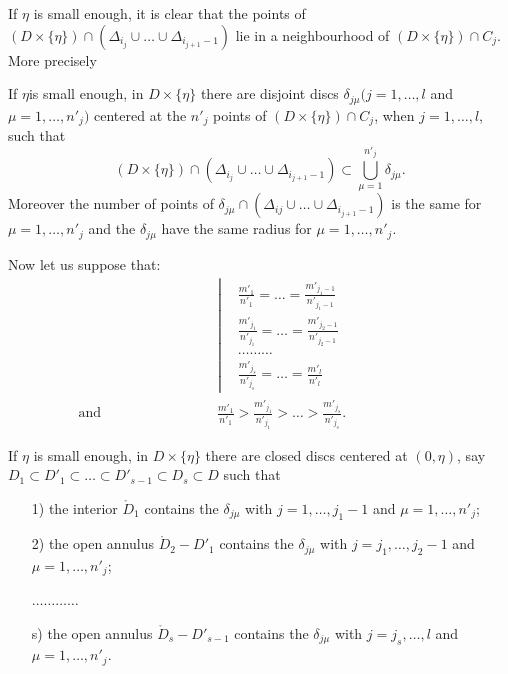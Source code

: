 If $\eta$ is small enough, it is clear that the points of $(D \times \{\eta\}) \cap (\Delta_{i_j} \cup \ldots \cup \Delta_{i_{j+1}-1})$ lie in a neighbourhood of $(D\times \{\eta\}) \cap C_j$. More precisely

\setcounter{lemma}{3}
\begin{lemma}\label{art15-lem2.4}
If $\eta$\pageoriginale is small enough, in $D \times \{\eta\}$ there are disjoint discs $\delta_{j\mu} (j = 1, \ldots, l$ and $\mu = 1, \ldots, n'_j)$ centered at the $n'_j$ points of $(D \times \{\eta\}) \cap C_j$, when $j = 1, \ldots, l$, such that 
$$
(D \times \{ \eta\}) \cap (\Delta_{i_j} \cup \ldots \cup \Delta_{i_{j+1} -1}) \subset \bigcup\limits^{n'_j}_{\mu = 1} \delta_{j\mu}.
$$
Moreover the number of points of $\delta_{j\mu} \cap (\Delta_{ij} \cup \ldots \cup \Delta_{i_{j+1}-1})$  is the same for $\mu=1, \ldots, n'_j$ and the $\delta_{j\mu}$ have the same radius for $\mu =1,\ldots, n'_j$.
\end{lemma}

Now let us suppose that:
\begin{align*}
& \left|
\begin{aligned}
& \frac{m'_1}{n'_1}  = \ldots = \frac{m'_{j_1 -1}}{n'_{j_1 -1}}\\
&  \frac{m'_{j_1}}{n'_{j_1}}   = \ldots = \frac{m'_{j_2 -1}}{n'_{j_2 -1}}\\
& \ldots \ldots \ldots \\
& \frac{m'_{j_s}}{n'_{j_s}} = \ldots = \frac{m'_l}{n'_l}
\end{aligned}
\right. \tag{2.5}\label{art15-eq2.5}\\
\text{ and  } \hspace{3cm} & \frac{m'_1}{n'_1} > \frac{m'_{j_1}}{n'_{j_1}} > \ldots > \frac{m'_{j_s}}{n'_{j_s}}. \hspace{3cm}
\end{align*}

\setcounter{lemma}{5}
\begin{lemma}\label{art15-lem2.6}
If $\eta$ is small enough, in $D \times \{\eta\}$ there are closed discs centered at $(0,\eta)$, say $D_1 \subset D'_1 \subset \ldots \subset D'_{s-1} \subset D_s \subset D$ such that 
\begin{itemize}
\item[\rm 1)] the interior $\mathring{D}_1$ contains the $\delta_{j\mu}$ with $j=1, \ldots, j_1-1$ and $\mu=1,\ldots, n'_j$;

\item[\rm 2)] the open annulus $\mathring{D}_2 - D'_1$ contains the $\delta_{j\mu}$ with $j = j_1, \ldots, j_2 -1$ and $\mu =1, \ldots, n'_j$;

$\ldots \ldots \ldots \ldots $

\item[\rm s)] the open annulus $\mathring{D}_s - D'_{s-1}$ contains the $\delta_{j\mu}$ with $j = j_s, \ldots , l$ and $\mu = 1, \ldots, n'_j$.
\end{itemize}
\end{lemma}

